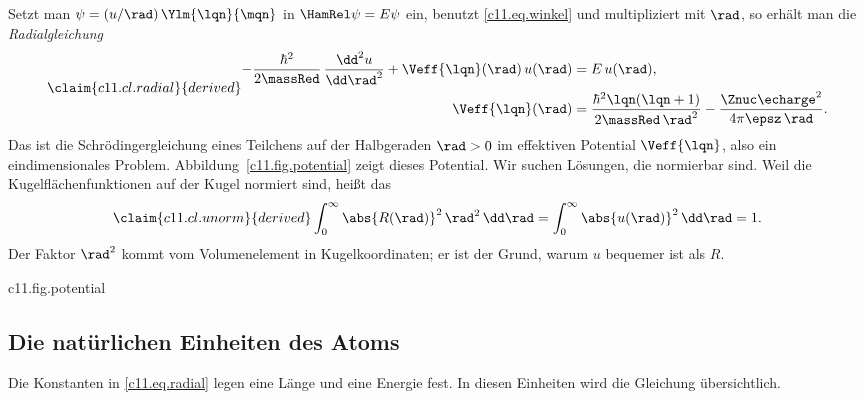 Setzt man $\psi = (u/\rad)\,\Ylm{\lqn}{\mqn}$ in $\HamRel\psi = E\psi$ ein, benutzt
\eqref{c11.eq.winkel} und multipliziert mit $\rad$, so erhält man die
\emph{Radialgleichung}
\begin{equation}\label{c11.eq.radial}\claim{c11.cl.radial}{derived}
  \begin{aligned}
    -\frac{\hbar^2}{2\massRed}\,\frac{\dd^2 u}{\dd\rad^2} + \Veff{\lqn}(\rad)\,u(\rad)
    &= E\,u(\rad), \\
    \Veff{\lqn}(\rad) &= \frac{\hbar^2\lqn(\lqn + 1)}{2\massRed\,\rad^2}
      - \frac{\Znuc\echarge^2}{4\pi\epsz\,\rad}.
  \end{aligned}
\end{equation}
Das ist die Schrödingergleichung eines Teilchens auf der Halbgeraden $\rad > 0$ im
effektiven Potential $\Veff{\lqn}$, also ein eindimensionales Problem.
Abbildung~\ref{c11.fig.potential} zeigt dieses Potential. Wir suchen Lösungen, die
normierbar sind. Weil die
Kugelflächenfunktionen auf der Kugel normiert sind, heißt das
\begin{equation}\label{c11.eq.unorm}\claim{c11.cl.unorm}{derived}
  \int_0^\infty \abs{R(\rad)}^2\,\rad^2\,\dd\rad = \int_0^\infty \abs{u(\rad)}^2\,\dd\rad = 1 .
\end{equation}
Der Faktor $\rad^2$ kommt vom Volumenelement in Kugelkoordinaten; er ist der Grund,
warum $u$ bequemer ist als $R$.

\begin{tpcfigure}{c11.fig.potential}
  \caption{Das effektive Potential $\Veff{\lqn}$ aus \eqref{c11.eq.radial} für
    $\Znuc = 1$. Durchgezogen: $\lqn = 0$, das reine Coulombpotential. Gestrichelt:
    $\lqn = 1$; der Zentrifugalterm hält das Teilchen vom Ursprung fern und erzeugt eine
    Mulde, deren tiefster Punkt markiert ist. Dünne waagerechte Linien: die Energien
    $\En{1}$, $\En{2}$, $\En{3}$ aus Theorem~\ref{c11.thm.spektrum}. Längen in Einheiten
    von $\aRed$, Energien in Einheiten von $\RydRed$; beide enthalten die reduzierte
    Masse.}
\end{tpcfigure}

\subsection{Die natürlichen Einheiten des Atoms}\label{c11.s4.1}

Die Konstanten in \eqref{c11.eq.radial} legen eine Länge und eine Energie fest. In
diesen Einheiten wird die Gleichung übersichtlich.


